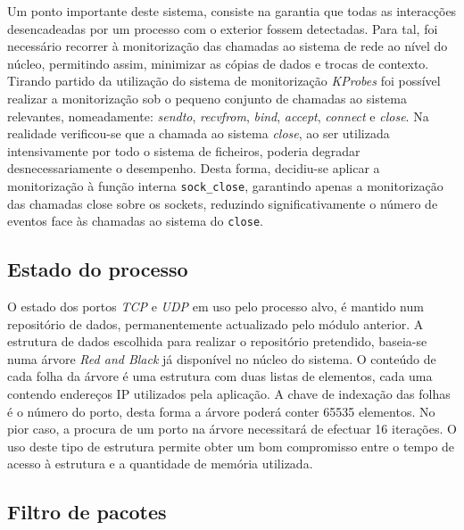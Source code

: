 \documentclass[a4paper]{llncs}
\newcommand{\td}[1]{\todo[inline]{#1}}
\begin{document}
Um ponto importante deste sistema, consiste na garantia que todas as interacções desencadeadas por um processo com o exterior fossem detectadas.
 Para tal, foi necessário recorrer à monitorização das chamadas ao sistema de rede ao nível do núcleo, permitindo assim, minimizar as cópias de dados e trocas de contexto.
 Tirando partido da utilização do sistema de monitorização \textit{KProbes} foi possível realizar a monitorização sob o pequeno conjunto de chamadas ao sistema relevantes, nomeadamente: \textit{sendto}, \textit{recvfrom}, \textit{bind}, \textit{accept}, \textit{connect} e \textit{close}.
 Na realidade verificou-se que a chamada ao sistema \textit{close}, ao ser utilizada intensivamente por todo o sistema de ficheiros, poderia degradar desnecessariamente o desempenho.
 Desta forma, decidiu-se aplicar a monitorização à função interna \texttt{sock\_close}, garantindo apenas a monitorização das chamadas close sobre os sockets, reduzindo significativamente o número de eventos face às chamadas ao sistema do \texttt{close}.

\subsection*{Estado do processo}
\label{sub:data_repository}

O estado dos portos \textit{TCP} e \textit{UDP} em uso pelo processo alvo, é mantido num repositório de dados, permanentemente actualizado pelo módulo anterior. 
 A estrutura de dados escolhida para realizar o repositório pretendido, baseia-se numa árvore \textit{Red and Black} já disponível no núcleo do sistema.
 O conteúdo de cada folha da árvore é uma estrutura com duas listas de elementos, cada uma contendo endereços IP utilizados pela aplicação.
 A chave de indexação das folhas é o número do porto, desta forma a árvore poderá conter 65535 elementos.
 No pior caso, a procura de um porto na árvore necessitará de efectuar 16 iterações.
  O uso deste tipo de estrutura permite obter um bom compromisso entre o tempo de acesso à estrutura e a quantidade de memória utilizada.


\subsection*{Filtro de pacotes}
\label{sub:packet_filter}
\end{document}
